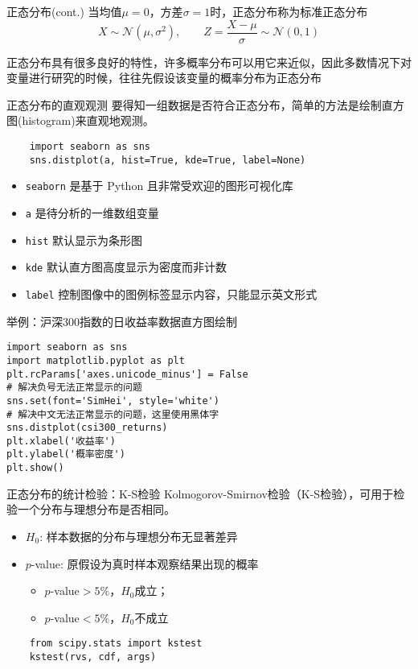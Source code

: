 \documentclass[t]{beamer}
\begin{document}
\begin{frame}[fragile]{正态分布(cont.)}
当均值$\mu=0$，方差$\sigma=1$时，正态分布称为标准正态分布
\[X\sim \mathcal{N}(\mu,\sigma^2),\qquad Z=\frac{X-\mu}{\sigma}\sim  \mathcal{N}(0,1)\]

正态分布具有很多良好的特性，许多概率分布可以用它来近似，因此多数情况下对变量进行研究的时候，往往先假设该变量的概率分布为正态分布

\end{frame}

\begin{frame}[fragile]{正态分布的直观观测}
要得知一组数据是否符合正态分布，简单的方法是绘制直方图(histogram)来直观地观测。

\begin{lstlisting}
    import seaborn as sns
    sns.distplot(a, hist=True, kde=True, label=None)
\end{lstlisting}
\begin{itemize}
    \item \verb|seaborn| 是基于 Python 且非常受欢迎的图形可视化库
    \item \verb|a| 是待分析的一维数组变量
    \item \verb|hist| 默认显示为条形图
    \item \verb|kde| 默认直方图高度显示为密度而非计数
    \item \verb|label| 控制图像中的图例标签显示内容，只能显示英文形式
\end{itemize}
\end{frame}



\begin{frame}[fragile]{举例：沪深300指数的日收益率数据直方图绘制}
\begin{lstlisting}
import seaborn as sns
import matplotlib.pyplot as plt
plt.rcParams['axes.unicode_minus'] = False
# 解决负号无法正常显示的问题
sns.set(font='SimHei', style='white')
# 解决中文无法正常显示的问题，这里使用黑体字
sns.distplot(csi300_returns)
plt.xlabel('收益率')
plt.ylabel('概率密度')
plt.show()
\end{lstlisting}
\end{frame}

\begin{frame}[fragile]{正态分布的统计检验：K-S检验}
Kolmogorov-Smirnov检验（K-S检验），可用于检验一个分布与理想分布是否相同。
\begin{itemize}
    \item $H_0$: 样本数据的分布与理想分布无显著差异
    \item $p$-value: 原假设为真时样本观察结果出现的概率
\begin{itemize}
    \item $p$-value$>5\%$，$H_0$成立；
    \item $p$-value$<5\%$，$H_0$不成立
\end{itemize}
\end{itemize}

\begin{lstlisting}
    from scipy.stats import kstest
    kstest(rvs, cdf, args)
\end{lstlisting}



\end{frame}
\end{document}
